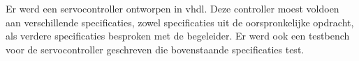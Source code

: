 Er werd een servocontroller ontworpen in \gls{vhdl}. Deze controller moest voldoen aan verschillende specificaties, zowel specificaties uit de oorspronkelijke opdracht, als verdere specificaties besproken met de begeleider. Er werd ook een testbench voor de servocontroller geschreven die bovenstaande specificaties test.